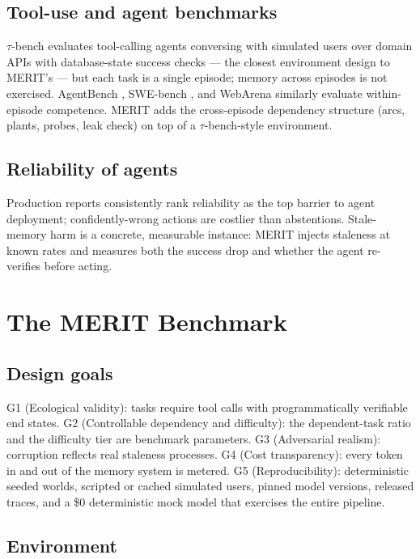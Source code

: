 \documentclass[journal]{IEEEtran}
\newcommand{\merit}{\textsc{MERIT}}
\begin{document}
\subsection{Tool-use and agent benchmarks}

$\tau$-bench \cite{taubench} evaluates tool-calling agents conversing with
simulated users over domain APIs with database-state success checks --- the
closest environment design to \merit{}'s --- but each task is a single episode;
memory across episodes is not exercised. AgentBench \cite{agentbench},
SWE-bench \cite{swebench}, and WebArena \cite{webarena} similarly evaluate
within-episode competence. \merit{} adds the cross-episode dependency
structure (arcs, plants, probes, leak check) on top of a $\tau$-bench-style
environment.

\subsection{Reliability of agents}

Production reports consistently rank reliability as the top barrier to agent
deployment; confidently-wrong actions are costlier than abstentions.
Stale-memory harm is a concrete, measurable instance: \merit{} injects
staleness at known rates and measures both the success drop and whether the
agent re-verifies before acting.

\section{The \merit{} Benchmark}

\subsection{Design goals}

G1 (Ecological validity): tasks require tool calls with programmatically
verifiable end states. G2 (Controllable dependency and difficulty): the
dependent-task ratio and the difficulty tier are benchmark parameters. G3
(Adversarial realism): corruption reflects real staleness processes. G4 (Cost
transparency): every token in and out of the memory system is metered. G5
(Reproducibility): deterministic seeded worlds, scripted or cached simulated
users, pinned model versions, released traces, and a \$0 deterministic mock
model that exercises the entire pipeline.

\subsection{Environment}
\end{document}
